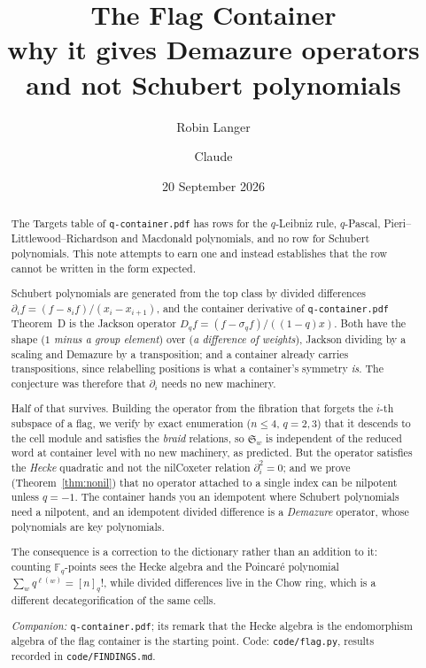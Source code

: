 \documentclass[11pt,a4paper]{article}
\title{\bfseries The Flag Container\\[0.4em]
\large why it gives Demazure operators and not Schubert polynomials}
\author{Robin Langer \and Claude}
\date{20 September 2026}
\theoremstyle{definition}
\theoremstyle{remark}
\newcommand{\FF}{\mathbb{F}}
\newcommand{\Schub}{\mathfrak{S}}
\begin{document}
\maketitle

\begin{abstract}
The Targets table of \texttt{q-container.pdf} has rows for the $q$-Leibniz rule,
$q$-Pascal, Pieri--Littlewood--Richardson and Macdonald polynomials, and no row
for Schubert polynomials. This note attempts to earn one and instead establishes
that the row cannot be written in the form expected.

Schubert polynomials are generated from the top class by divided differences
$\partial_i f = (f - s_i f)/(x_i - x_{i+1})$, and the container derivative of
\texttt{q-container.pdf} Theorem~D is the Jackson operator
$D_q f = (f - \sigma_q f)/((1-q)x)$. Both have the shape
(\emph{$1$ minus a group element}) over (\emph{a difference of weights}), Jackson
dividing by a scaling and Demazure by a transposition; and a container already
carries transpositions, since relabelling positions is what a container's symmetry
\emph{is}. The conjecture was therefore that $\partial_i$ needs no new machinery.

Half of that survives. Building the operator from the fibration that forgets the
$i$-th subspace of a flag, we verify by exact enumeration
($n \le 4$, $q = 2, 3$) that it descends to the cell module and satisfies the
\emph{braid} relations, so $\Schub_w$ is independent of the reduced word at
container level with no new machinery, as predicted. But the operator satisfies
the \emph{Hecke} quadratic and not the nilCoxeter relation $\partial_i^2 = 0$;
and we prove (Theorem~\ref{thm:nonil}) that no operator attached to a single
index can be nilpotent unless $q = -1$. The container hands you an idempotent
where Schubert polynomials need a nilpotent, and an idempotent divided difference
is a \emph{Demazure} operator, whose polynomials are key polynomials.

The consequence is a correction to the dictionary rather than an addition to it:
counting $\FF_q$-points sees the Hecke algebra and the Poincar\'e polynomial
$\sum_w q^{\ell(w)} = [n]_q!$, while divided differences live in the Chow ring,
which is a different decategorification of the same cells.

\medskip
\noindent\emph{Companion:} \texttt{q-container.pdf}; its remark that the Hecke algebra is the endomorphism algebra of
the flag container is the starting point. Code: \texttt{code/flag.py},
results recorded in \texttt{code/FINDINGS.md}.
\end{abstract}
\end{document}
